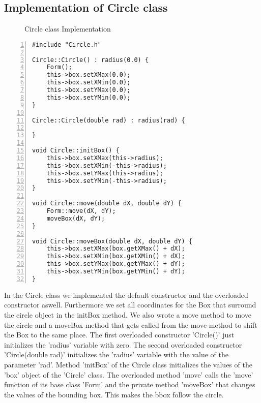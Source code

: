 \documentclass{article}
\begin{document}
\subsection{Implementation of Circle class}
\begin{figure}
\scriptsize{\caption{Circle class Implementation}}
\end{figure}
\begin{lstlisting}[basicstyle=\footnotesize\ttfamily, numbers=left, stepnumber=1, numberstyle = \normalsize]
#include "Circle.h"

Circle::Circle() : radius(0.0) {
	Form();
	this->box.setXMax(0.0);
	this->box.setXMin(0.0);
	this->box.setYMax(0.0);
	this->box.setYMin(0.0);
}

Circle::Circle(double rad) : radius(rad) {

}

void Circle::initBox() {
	this->box.setXMax(this->radius);
	this->box.setXMin(-this->radius);
	this->box.setYMax(this->radius);
	this->box.setYMin(-this->radius);
}

void Circle::move(double dX, double dY) {
	Form::move(dX, dY);
	moveBox(dX, dY);
}

void Circle::moveBox(double dX, double dY) {
	this->box.setXMax(box.getXMax() + dX);
	this->box.setXMin(box.getXMin() + dX);
	this->box.setYMax(box.getYMax() + dY);
	this->box.setYMin(box.getYMin() + dY);
}

\end{lstlisting}
\normalsize{In the Circle class we implemented the default constructor and the overloaded constructor aswell. Furthermore we set all coordinates for the Box that surround the circle object in the initBox method. We also wrote a move method to move the circle and a moveBox method that gets called from the move method to shift the Box to the same place.\newline
\newline
The first overloaded constructor 'Circle()' just initializes the 'radius' variable with zero.
The second overloaded constructor 'Circle(double rad)' initializes the 'radius' variable with the value of the parameter 'rad'.
Method 'initBox' of the Circle class initializes the values of the 'box' object of the 'Circle' class.
The overloaded method 'move' calls the 'move' function of its base class 'Form' and the private method 'moveBox' that changes the values of the bounding box. This makes the bbox follow the circle.
}
\newpage
\end{document}
